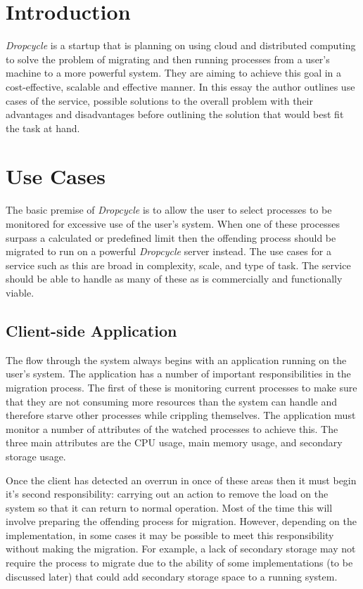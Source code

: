 \documentclass[12pt, a4paper]{article}
\title{\thetitle}
\author{\theauthor}
\date{\today}
\begin{document}
\maketitle
\thispagestyle{empty}

\section{Introduction}

\emph{Dropcycle} is a startup that is planning on using cloud and distributed
computing to solve the problem of migrating and then running processes from a
user's machine to a more powerful system. They are aiming to achieve this goal
in a cost-effective, scalable and effective manner. In this essay the author
outlines use cases of the service, possible solutions to the overall problem
with their advantages and disadvantages before outlining the solution that would
best fit the task at hand.

\section{Use Cases}

The basic premise of \emph{Dropcycle} is to allow the user to select processes
to be monitored for excessive use of the user's system. When one of these
processes surpass a calculated or predefined limit then the offending process
should be migrated to run on a powerful \emph{Dropcycle} server instead. The use
cases for a service such as this are broad in complexity, scale, and type of
task. The service should be able to handle as many of these as is commercially
and functionally viable.

\subsection{Client-side Application}

The flow through the system always begins with an application running on the
user's system. The application has a number of important responsibilities in the
migration process. The first of these is monitoring current processes to make
sure that they are not consuming more resources than the system can handle and
therefore starve other processes while crippling themselves. The application
must monitor a number of attributes of the watched processes to achieve this.
The three main attributes are the CPU usage, main memory usage, and secondary
storage usage.

Once the client has detected an overrun in once of these areas then it must
begin it's second responsibility: carrying out an action to remove the load on
the system so that it can return to normal operation. Most of the time this will
involve preparing the offending process for migration. However, depending on the
implementation, in some cases it may be possible to meet this responsibility
without making the migration. For example, a lack of secondary storage may not
require the process to migrate due to the ability of some implementations (to be
discussed later) that could add secondary storage space to a running system.
\end{document}
